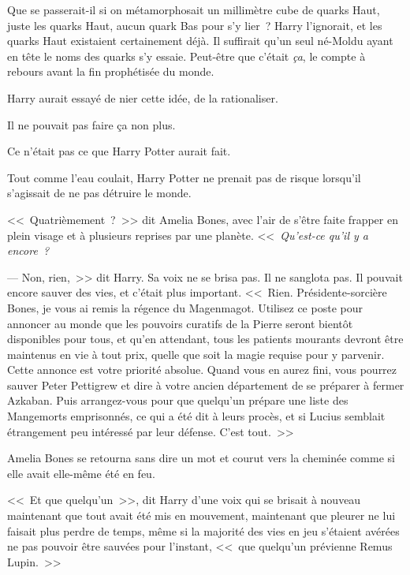 Que se passerait-il si on métamorphosait un millimètre cube de quarks Haut, juste les quarks Haut, aucun quark Bas pour s'y lier~? Harry l'ignorait, et les quarks Haut existaient certainement déjà. Il suffirait qu'un seul né-Moldu ayant en tête le noms des quarks s'y essaie. Peut-être que c'était \emph{ça}, le compte à rebours avant la fin prophétisée du monde.

Harry aurait essayé de nier cette idée, de la rationaliser.

Il ne pouvait pas faire ça non plus.

Ce n'était pas ce que Harry Potter aurait fait.

Tout comme l'eau coulait, Harry Potter ne prenait pas de risque lorsqu'il s'agissait de ne pas détruire le monde.

<<~Quatrièmement~?~>> dit Amelia Bones, avec l'air de s'être faite frapper en plein visage et à plusieurs reprises par une planète. <<~\emph{Qu'est-ce qu'il y a encore~?}

--- Non, rien,~>> dit Harry. Sa voix ne se brisa pas. Il ne sanglota pas. Il pouvait encore sauver des vies, et c'était plus important. <<~Rien. Présidente-sorcière Bones, je vous ai remis la régence du Magenmagot. Utilisez ce poste pour annoncer au monde que les pouvoirs curatifs de la Pierre seront bientôt disponibles pour tous, et qu'en attendant, tous les patients mourants devront être maintenus en vie à tout prix, quelle que soit la magie requise pour y parvenir. Cette annonce est votre priorité absolue. Quand vous en aurez fini, vous pourrez sauver Peter Pettigrew et dire à votre ancien département de se préparer à fermer Azkaban. Puis arrangez-vous pour que quelqu'un prépare une liste des Mangemorts emprisonnés, ce qui a été dit à leurs procès, et si Lucius semblait étrangement peu intéressé par leur défense. C'est tout.~>>

Amelia Bones se retourna sans dire un mot et courut vers la cheminée comme si elle avait elle-même été en feu.

<<~Et que quelqu'un~>>, dit Harry d'une voix qui se brisait à nouveau maintenant que tout avait été mis en mouvement, maintenant que pleurer ne lui faisait plus perdre de temps, même si la majorité des vies en jeu s'étaient avérées ne pas pouvoir être sauvées pour l'instant, <<~que quelqu'un prévienne Remus Lupin.~>>
